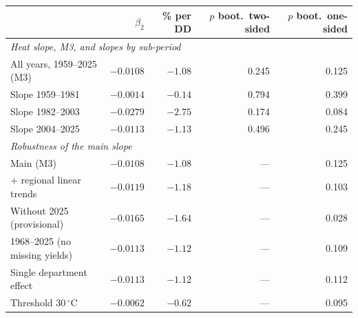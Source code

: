 \begin{tabular}{lrrrr}
\toprule
& $\hat\beta_2$ & \% per DD & $p$ boot.\ two-sided & $p$ boot.\ one-sided \\
\midrule
\multicolumn{5}{l}{\emph{Heat slope, M3, and slopes by sub-period}} \\
All years, 1959--2025 (M3) & $-0.0108$ & $-1.08$ & 0.245 & 0.125 \\
Slope 1959--1981 & $-0.0014$ & $-0.14$ & 0.794 & 0.399 \\
Slope 1982--2003 & $-0.0279$ & $-2.75$ & 0.174 & 0.084 \\
Slope 2004--2025 & $-0.0113$ & $-1.13$ & 0.496 & 0.245 \\
\midrule
\multicolumn{5}{l}{\emph{Robustness of the main slope}} \\
Main (M3) & $-0.0108$ & $-1.08$ & --- & 0.125 \\
+ regional linear trends & $-0.0119$ & $-1.18$ & --- & 0.103 \\
Without 2025 (provisional) & $-0.0165$ & $-1.64$ & --- & 0.028 \\
1968--2025 (no missing yields) & $-0.0113$ & $-1.12$ & --- & 0.109 \\
Single department effect & $-0.0113$ & $-1.12$ & --- & 0.112 \\
Threshold 30\,$^{\circ}$C & $-0.0062$ & $-0.62$ & --- & 0.095 \\
\bottomrule
\end{tabular}
